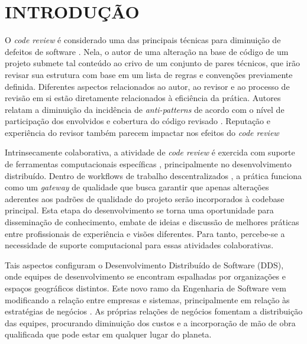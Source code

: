 \documentclass[12pt,openany,oneside,a4paper,english,brazil]{abntbibufjf}
\begin{document}
\tableofcontents*
\cleardoublepage



\textual
\pagestyle{simple}


\chapter{INTRODUÇÃO}  %

  O \textit{code review} é considerado uma das principais técnicas para diminuição de defeitos de software \cite{Boehm2001}. Nela, o autor de uma alteração na base de código de um projeto submete tal conteúdo ao crivo de um conjunto de pares técnicos, que irão revisar sua estrutura com base em um lista de regras e convenções previamente definida. Diferentes aspectos relacionados ao autor, ao revisor e ao processo de revisão em si estão diretamente relacionados à eficiência da prática. Autores relatam a diminuição da incidência de \textit{anti-patterns} \cite{Kemerer2009} de acordo com o nível de participação dos envolvidos e cobertura do código revisado \cite{Meneely201437, Morales2015171, Bavota201581}. Reputação \cite{Baysal2013122, Bosu2014} e experiência \cite{Kononenko2015111} do revisor também parecem impactar nos efeitos do \textit{code review}

  Intrinsecamente colaborativa, a atividade de \textit{code review} é exercida com suporte de ferramentas computacionais específicas \cite{Bacchelli2013}, principalmente no desenvolvimento distribuído. Dentro de workflows de trabalho descentralizados \cite{gousios2016}, a prática funciona como um \textit{gateway} de qualidade que busca garantir que apenas alterações aderentes aos padrões de qualidade do projeto serão incorporados à codebase principal. Esta etapa do desenvolvimento se torna uma oportunidade para disseminação de conhecimento, embate de ideias e discussão de melhores práticas entre profissionais de experiência e visões diferentes. Para tanto, percebe-se a necessidade de suporte computacional para essas atividades colaborativas.

  Tais aspectos configuram o Desenvolvimento Distribuído de Software (DDS), onde equipes de desenvolvimento se encontram espalhadas por organizações e espaços geográficos distintos. Este novo ramo da Engenharia de Software vem modificando a relação entre empresas e sistemas, principalmente em relação às estratégias de negócios \cite{audy2007}. As próprias relações de negócios fomentam a distribuição das equipes, procurando diminuição dos custos e a incorporação de mão de obra qualificada que pode estar em qualquer lugar do planeta.
\end{document}

